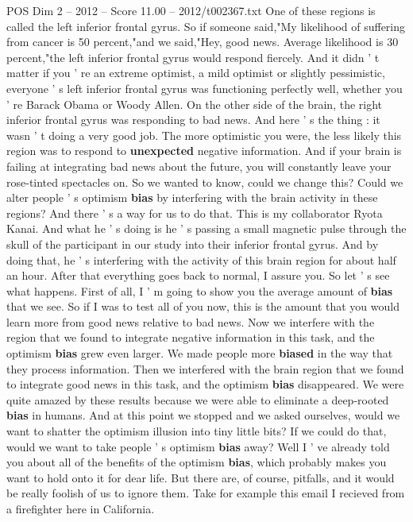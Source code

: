 \begin{textsample}{POS Dim 2 – 2012 – Score 11.00 – 2012/t002367.txt}
One of these regions is called the left inferior frontal gyrus.
So if someone said,"My likelihood of suffering from cancer is 50 percent,"and we said,"Hey, good news.
Average likelihood is 30 percent,"the left inferior frontal gyrus would respond fiercely.
And it didn ' t matter if you ' re an extreme optimist, a mild optimist or slightly pessimistic, everyone ' s left inferior frontal gyrus was functioning perfectly well, whether you ' re Barack Obama or Woody Allen.
On the other side of the brain, the right inferior frontal gyrus was responding to bad news.
And here ' s the thing : it wasn ' t doing a very good job.
The more optimistic you were, the less likely this region was to respond to \textbf{unexpected} negative information.
And if your brain is failing at integrating bad news about the future, you will constantly leave your rose-tinted spectacles on.
So we wanted to know, could we change this?
Could we alter people ' s optimism \textbf{bias} by interfering with the brain activity in these regions?
And there ' s a way for us to do that.
This is my collaborator Ryota Kanai.
And what he ' s doing is he ' s passing a small magnetic pulse through the skull of the participant in our study into their inferior frontal gyrus.
And by doing that, he ' s interfering with the activity of this brain region for about half an hour.
After that everything goes back to normal, I assure you.
So let ' s see what happens.
First of all, I ' m going to show you the average amount of \textbf{bias} that we see.
So if I was to test all of you now, this is the amount that you would learn more from good news relative to bad news.
Now we interfere with the region that we found to integrate negative information in this task, and the optimism \textbf{bias} grew even larger.
We made people more \textbf{biased} in the way that they process information.
Then we interfered with the brain region that we found to integrate good news in this task, and the optimism \textbf{bias} disappeared.
We were quite amazed by these results because we were able to eliminate a deep-rooted \textbf{bias} in humans.
And at this point we stopped and we asked ourselves, would we want to shatter the optimism illusion into tiny little bits?
If we could do that, would we want to take people ' s optimism \textbf{bias} away?
Well I ' ve already told you about all of the benefits of the optimism \textbf{bias}, which probably makes you want to hold onto it for dear life.
But there are, of course, pitfalls, and it would be really foolish of us to ignore them.
Take for example this email I recieved from a firefighter here in California.

\end{textsample}
